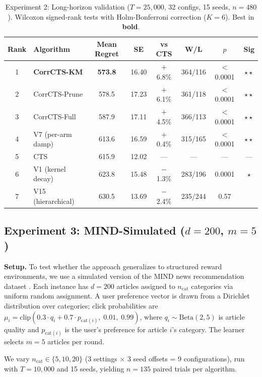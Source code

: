 \documentclass{article}
\theoremstyle{plain}
\theoremstyle{definition}
\theoremstyle{remark}
\begin{document}
\begin{table}[t]
\caption{Experiment 2: Long-horizon validation ($T{=}25{,}000$, 32 configs, 15 seeds, $n{=}480$). Wilcoxon signed-rank tests with Holm-Bonferroni correction ($K{=}6$). Best in \textbf{bold}.}
\label{tab:tier7}
\centering
\small
\begin{tabular}{@{}clcccccc@{}}
\toprule
Rank & Algorithm & Mean Regret & SE & vs CTS & W/L & $p$ & Sig \\
\midrule
1 & \textbf{CorrCTS-KM} & \textbf{573.8} & 16.40 & $+$6.8\% & 364/116 & ${<}$0.0001 & $\star\star$ \\
2 & CorrCTS-Prune & 578.5 & 17.23 & $+$6.1\% & 361/118 & ${<}$0.0001 & $\star\star$ \\
3 & CorrCTS-Full & 587.9 & 17.11 & $+$4.5\% & 366/113 & ${<}$0.0001 & $\star\star$ \\
4 & V7 (per-arm damp) & 613.6 & 16.59 & $+$0.4\% & 315/165 & ${<}$0.0001 & $\star\star$ \\
5 & CTS & 615.9 & 12.02 & --- & --- & --- & --- \\
6 & V1 (kernel decay) & 623.8 & 15.48 & $-$1.3\% & 283/196 & 0.0001 & $\star$ \\
7 & V15 (hierarchical) & 630.5 & 13.69 & $-$2.4\% & 235/244 & 0.57 & \\
\bottomrule
\end{tabular}
\end{table}

\subsection{Experiment 3: MIND-Simulated ($d{=}200$, $m{=}5$)}\label{sec:exp3}

\textbf{Setup.}
To test whether the approach generalizes to structured reward environments, we use a simulated version of the MIND news recommendation dataset \citep{wu2020mind}.
Each instance has $d = 200$ articles assigned to $n_\text{cat}$ categories via uniform random assignment.
A user preference vector is drawn from a Dirichlet distribution over categories; click probabilities are $\mu_i = \text{clip}(0.3 \cdot q_i + 0.7 \cdot p_{\text{cat}(i)},\; 0.01,\; 0.99)$, where $q_i \sim \text{Beta}(2, 5)$ is article quality and $p_{\text{cat}(i)}$ is the user's preference for article $i$'s category.
The learner selects $m = 5$ articles per round.

We vary $n_\text{cat} \in \{5, 10, 20\}$ (3 settings $\times$ 3 seed offsets = 9 configurations), run with $T = 10{,}000$ and 15 seeds, yielding $n = 135$ paired trials per algorithm.
\end{document}
